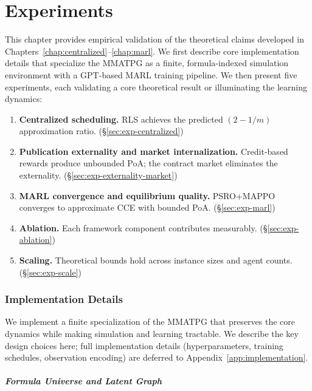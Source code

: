 \chapter{Experiments}\label{chap:experiments}

This chapter provides empirical validation of the theoretical claims developed in Chapters~\ref{chap:centralized}--\ref{chap:marl}. We first describe core implementation details that specialize the MMATPG as a finite, formula-indexed simulation environment with a GPT-based MARL training pipeline. We then present five experiments, each validating a core theoretical result or illuminating the learning dynamics:

\begin{enumerate}
    \item \textbf{Centralized scheduling.} RLS achieves the predicted $(2-1/m)$ approximation ratio. (\S\ref{sec:exp-centralized})
    \item \textbf{Publication externality and market internalization.} Credit-based rewards produce unbounded PoA; the contract market eliminates the externality. (\S\ref{sec:exp-externality-market})
    \item \textbf{MARL convergence and equilibrium quality.} PSRO+MAPPO converges to approximate CCE with bounded PoA. (\S\ref{sec:exp-marl})
    \item \textbf{Ablation.} Each framework component contributes measurably. (\S\ref{sec:exp-ablation})
    \item \textbf{Scaling.} Theoretical bounds hold across instance sizes and agent counts. (\S\ref{sec:exp-scale})
\end{enumerate}


\subsection{Implementation Details}\label{sec:implementation}

We implement a finite specialization of the MMATPG that preserves the core dynamics while making simulation and learning tractable. We describe the key design choices here; full implementation details (hyperparameters, training schedules, observation encoding) are deferred to Appendix~\ref{app:implementation}.

\paragraph{Formula Universe and Latent Graph}

